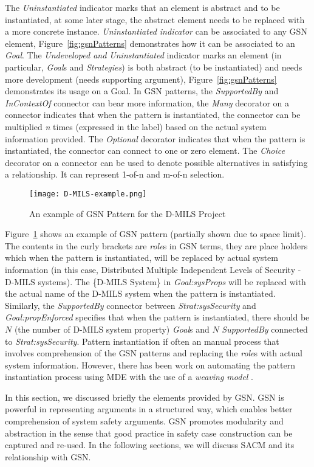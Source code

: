 The \textit{Uninstantiated} indicator marks that an element is abstract and to be instantiated, at some later stage, the abstract element needs to be replaced with a more concrete instance. \textit{Uninstantiated indicator} can be associated to any GSN element, Figure~\ref{fig:gsnPatterns} demonstrates how it can be associated to an \textit{Goal}. The \textit{Undeveloped and Uninstantiated} indicator marks an element (in particular, \textit{Goal}s and \textit{Strategies}) is both abstract (to be instantiated) and needs more development (needs supporting argument), Figure~\ref{fig:gsnPatterns} demonstrates its usage on a Goal. In GSN patterns, the \textit{SupportedBy} and \textit{InContextOf} connector can bear more information, the \textit{Many} decorator on a connector indicates that when the pattern is instantiated, the connector can be multiplied \textit{n} times (expressed in the label) based on the actual system information provided. The \textit{Optional} decorator indicates that when the pattern is instantiated, the connector can connect to one or zero element. The \textit{Choice} decorator on a connector can be used to denote possible alternatives in satisfying a relationship. It can represent 1-of-n and m-of-n selection. 

\begin{figure}[ht!]
	\centering
	\texttt{[image: D-MILS-example.png]}
	\caption{An example of GSN Pattern for the D-MILS Project \cite{}}
	\label{fig:dmilsPattern}
\end{figure}

Figure~\ref{fig:dmilsPattern} shows an example of GSN pattern (partially shown due to space limit). The contents in the curly brackets are \textit{role}s in GSN terms, they are place holders which when the pattern is instantiated, will be replaced by actual system information (in this case, Distributed Multiple Independent Levels of Security - D-MILS systems). The \{D-MILS System\} in \textit{Goal:sysProps} will be replaced with the actual name of the D-MILS system when the pattern is instantiated. Similarly, the \textit{SupportedBy} connector between \textit{Strat:sysSecurity} and \textit{Goal:propEnforced} specifies that when the pattern is instantiated, there should be $N$ (the number of D-MILS system property) \textit{Goal}s and $N$ \textit{SupportedBy} connected to \textit{Strat:sysSecurity}. Pattern instantiation if often an manual process that involves comprehension of the GSN patterns and replacing the \textit{role}s with actual system information. However, there has been work on automating the pattern instantiation process using MDE with the use of a \textit{weaving model} \cite{hawkins2015weaving}. 

In this section, we discussed briefly the elements provided by GSN. GSN is powerful in representing arguments in a structured way, which enables better comprehension of system safety arguments. GSN promotes modularity and abstraction in the sense that good practice in safety case construction can be captured and re-used. In the following sections, we will discuss SACM and its relationship with GSN. 